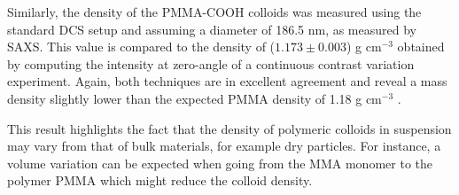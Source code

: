 Similarly, the density of the PMMA-COOH colloids was measured using the standard DCS setup and assuming a diameter of 186.5 nm, as measured by SAXS. This value is compared to the density of ($1.173\pm0.003$) g cm$^{-3}$ obtained by computing the intensity at zero-angle of a continuous contrast variation experiment. Again, both techniques are in excellent agreement and reveal a mass density slightly lower than the expected PMMA density of 1.18 g cm$^{-3}$ \citep{dingenouts_analysis_1999}.

This result highlights the fact that the density of polymeric colloids in suspension may vary from that of bulk materials, for example dry particles. For instance, a volume variation can be expected when going from the MMA monomer to the polymer PMMA \citep{nichols_prediction_1950} which might reduce the colloid density.
